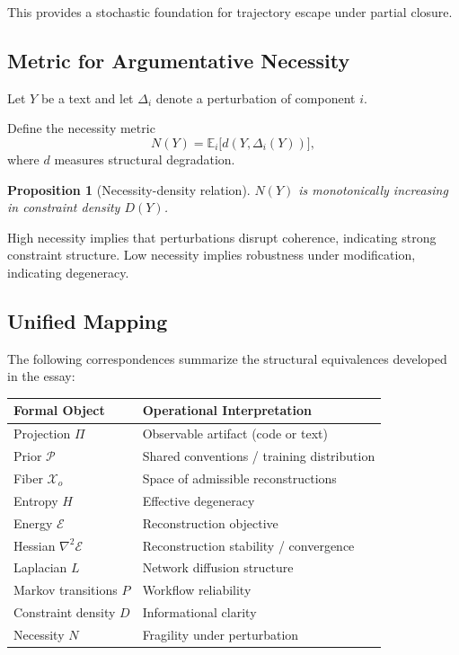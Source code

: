 \documentclass[12pt, oneside]{article}
\theoremstyle{plain}
\newtheorem{proposition}[theorem]{Proposition}
\theoremstyle{definition}
\theoremstyle{remark}
\newcommand{\proj}{\Pi}
\newcommand{\energy}{\mathcal{E}}
\newcommand{\config}{\mathcal{X}}
\newcommand{\prior}{\mathcal{P}}
\begin{document}
This provides a stochastic foundation for trajectory escape under partial closure.

\subsection{Metric for Argumentative Necessity}

Let $Y$ be a text and let $\Delta_i$ denote a perturbation of component $i$.

Define the necessity metric
\[
  N(Y) = \mathbb{E}_i \big[ d(Y, \Delta_i(Y)) \big],
\]
where $d$ measures structural degradation.

\begin{proposition}[Necessity-density relation]
$N(Y)$ is monotonically increasing in constraint density $D(Y)$.
\end{proposition}

High necessity implies that perturbations disrupt coherence, indicating strong
constraint structure. Low necessity implies robustness under modification,
indicating degeneracy.

\subsection{Unified Mapping}

The following correspondences summarize the structural equivalences developed in the essay:

\begin{center}
\begin{tabular}{ll}
\textbf{Formal Object} & \textbf{Operational Interpretation} \\
\hline
Projection $\proj$ & Observable artifact (code or text) \\
Prior $\prior$ & Shared conventions / training distribution \\
Fiber $\config_o$ & Space of admissible reconstructions \\
Entropy $H$ & Effective degeneracy \\
Energy $\energy$ & Reconstruction objective \\
Hessian $\nabla^2 \energy$ & Reconstruction stability / convergence \\
Laplacian $L$ & Network diffusion structure \\
Markov transitions $P$ & Workflow reliability \\
Constraint density $D$ & Informational clarity \\
Necessity $N$ & Fragility under perturbation \\
\end{tabular}
\end{center}
\end{document}
